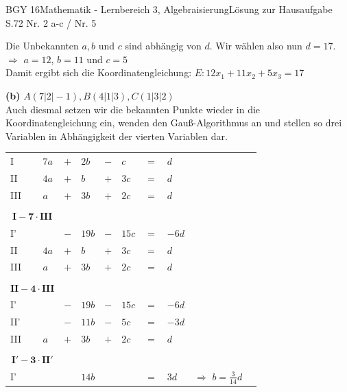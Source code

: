 \documentclass[oneside,openany,headings=optiontotoc,11pt,numbers=noenddot]{scrreprt}
\begin{document}
\begin{worksheet}{BGY 16}{Mathematik - Lernbereich 3, Algebraisierung}{Lösung zur Hausaufgabe S.72 Nr. 2 a-c / Nr. 5}
\begin{framed}
			Die Unbekannten \(a, b\) und \(c\) sind abhängig von \(d\). Wir wählen also nun \colorbox{blue!5}{\(d = 17\)}.\\
			\(\Rightarrow\) \colorbox{green!10}{\(a = 12\)}, \colorbox{green!10}{\(b =11\)} und \colorbox{green!10}{\(c = 5\)}\\
			Damit ergibt sich die Koordinatengleichung: \colorbox{green!10}{\(E: 12x_1 +11x_2 +5x_3 = 17\)}\\
			\par\bigskip\noindent
			\textbf{(b)} \(A(7|2|-1), B(4|1|3), C(1|3|2)\)\\
			Auch diesmal setzen wir die bekannten Punkte wieder in die Koordinatengleichung ein, wenden den Gauß-Algorithmus an und stellen so drei Variablen in Abhängigkeit der vierten Variablen dar.\\
			\begin{tabularx}{\textwidth}{lllllllllll}
				I & \(\) & \(7a\) & \(+\) & \(2b\) & \(-\) & \(c\) & \(=\) & \(d\)\\
				II & \(\) & \(4a\) & \(+\) & \(b\) & \(+\) & \(3c\) & \(=\) & \(d\)\\
				III & \(\) & \(a\) & \(+\) & \(3b\) & \(+\) & \(2c\) & \(=\) & \(d\)\\
				\cline{1-9}\\
				\multicolumn{3}{c}{\(\mathbf{I - 7\cdot III}\)}\\
				I' & \(\) & \(\) & \(-\) & \(19b\) & \(-\) & \(15c\) & \(=\) & \(-6d\)\\
				II & \(\) & \(4a\) & \(+\) & \(b\) & \(+\) & \(3c\) & \(=\) & \(d\)\\
				III & \(\) & \(a\) & \(+\) & \(3b\) & \(+\) & \(2c\) & \(=\) & \(d\)\\
				\cline{1-9}\\
				\multicolumn{3}{c}{\(\mathbf{II - 4\cdot III}\)}\\
				I' & \(\) & \(\) & \(-\) & \(19b\) & \(-\) & \(15c\) & \(=\) & \(-6d\)\\
				II' & \(\) & \(\) & \(-\) & \(11b\) & \(-\) & \(5c\) & \(=\) & \(-3d\)\\
				III & \(\) & \(a\) & \(+\) & \(3b\) & \(+\) & \(2c\) & \(=\) & \(d\)\\
				\cline{1-9}\\
				\multicolumn{3}{c}{\(\mathbf{I' - 3\cdot II'}\)}\\
				I' & \(\) & \(\) & \(\) & \(14b\) & \(\) & \(\) & \(=\) & \(3d\) & \(\Rightarrow\) \colorbox{green!10}{\(b = \frac{3}{14}d\)}\\

\end{tabularx}
\end{framed}
\end{worksheet}
\end{document}
